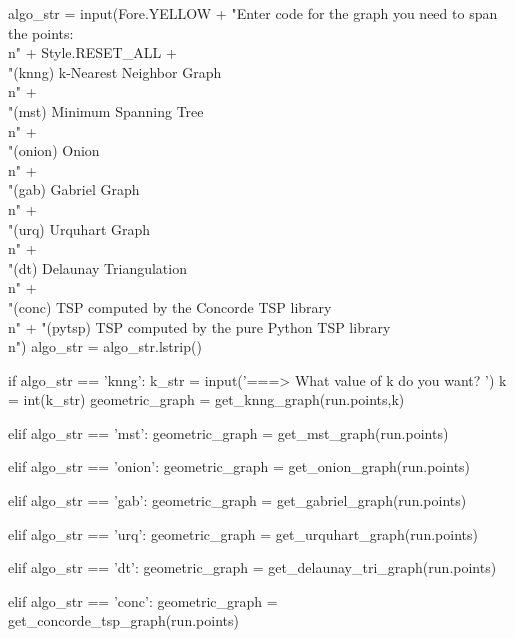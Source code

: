 \nwenddocs{}\endmoddef\nwstartdeflinemarkup{}\nwenddeflinemarkup
algo_str = input(Fore.YELLOW + "Enter code for the graph you need to span the points:\\n" + Style.RESET_ALL  +\\
                     "(knng)   k-Nearest Neighbor Graph        \\n"            +\\
                     "(mst)    Minimum Spanning Tree           \\n"            +\\
                     "(onion)  Onion                           \\n"            +\\
                     "(gab)    Gabriel Graph                 \\n"            +\\
                     "(urq)    Urquhart Graph                    \\n"            +\\
                     "(dt)     Delaunay Triangulation         \\n"             +\\
                     "(conc)   TSP computed by the Concorde TSP library \\n" +
                     "(pytsp)  TSP computed by the pure Python TSP library \\n")
algo_str = algo_str.lstrip()

if algo_str == 'knng':
      k_str = input('===> What value of k do you want? ')
      k     = int(k_str)
      geometric_graph = get_knng_graph(run.points,k)

elif algo_str == 'mst':
     geometric_graph = get_mst_graph(run.points)

elif algo_str == 'onion':
     geometric_graph = get_onion_graph(run.points)

elif algo_str == 'gab':
     geometric_graph = get_gabriel_graph(run.points)

elif algo_str == 'urq':
     geometric_graph = get_urquhart_graph(run.points)

elif algo_str == 'dt':
      geometric_graph = get_delaunay_tri_graph(run.points)

elif algo_str == 'conc':
     geometric_graph = get_concorde_tsp_graph(run.points)

